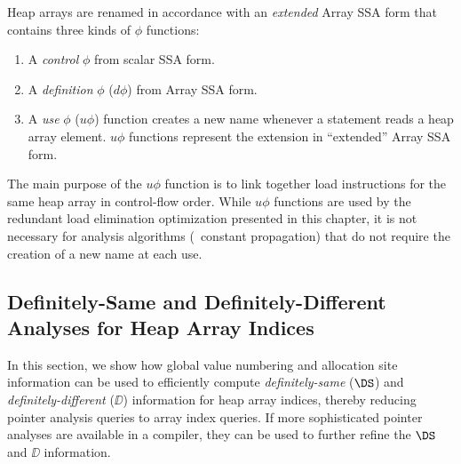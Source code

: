 
Heap arrays are renamed in accordance with 
an {\it extended}
Array SSA form that contains three kinds of $\phi$ functions:
\begin{enumerate}
\item 
A {\em control} $\phi$ from scalar SSA form.
\item
A {\em definition} $\phi$ ($d\phi$) from Array SSA form.
\item
A {\em use} $\phi$ ($u\phi$) function creates
a new name whenever a statement reads a heap array element.
$u\phi$ functions represent the extension
in ``extended'' Array SSA form.
\end{enumerate}
The main purpose of the $u\phi$ function is to link
together load instructions for the same heap array in control-flow order.   While $u\phi$ functions are used by the redundant load
elimination optimization presented in this chapter, it is not
necessary for analysis algorithms (\eg\ constant propagation) that do not require the creation of
a 
new name at each use.

\subsection{ Definitely-Same and Definitely-Different Analyses for Heap Array Indices}\label{svalnum}
In this section, we show how global value numbering and allocation
site information can be used to efficiently 
compute
{\it definitely-same} ($\DS$) and {\it definitely-different}
($\DD$) information for 
heap array indices, thereby 
reducing pointer analysis queries to array index queries.
If more sophisticated pointer analyses are available in a compiler,
they can be used to further refine the $\DS$ and $\DD$ information.

